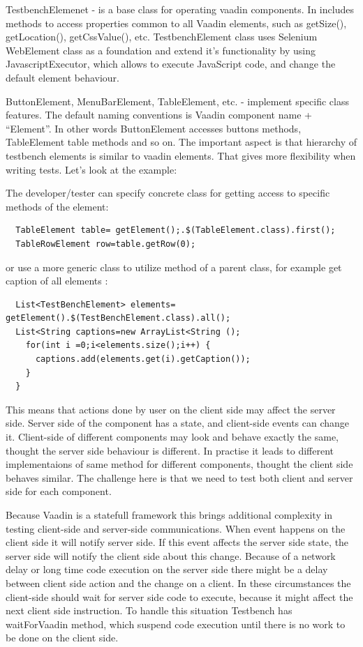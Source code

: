 \documentclass{article}
\begin{document}
TestbenchElemenet - is a base class for operating vaadin components. In includes methods to access properties common to all Vaadin elements, such as getSize(), getLocation(), getCssValue(), etc. TestbenchElement class uses Selenium WebElement class as a foundation and extend it’s functionality by using JavascriptExecutor, which allows to execute JavaScript code, and change the default element behaviour. 

ButtonElement, MenuBarElement, TableElement, etc. - implement specific class features. The default naming conventions is Vaadin component name + “Element”. In other words ButtonElement accesses buttons methods, TableElement table methods and so on. The important aspect is that hierarchy of testbench elements is similar to vaadin elements. That gives more flexibility when writing tests. Let’s look at the example:

The  developer/tester can specify concrete class for getting access to specific methods of the element:
 
 \lstset{language=Java}
  \begin{lstlisting}
  TableElement table= getElement();.$(TableElement.class).first();
  TableRowElement row=table.getRow(0);
 \end{lstlisting}
or use a more generic class to utilize method of a parent class, for example get caption of all elements :

  \lstset{language=Java}
  \begin{lstlisting}
  List<TestBenchElement> elements= getElement().$(TestBenchElement.class).all();
  List<String captions=new ArrayList<String ();
    for(int i =0;i<elements.size();i++) {
      captions.add(elements.get(i).getCaption());
    }
  }
  \end{lstlisting}

This means that actions done by user on the client side may affect the server side. Server side of the component has a state, and client-side events can change it.  Client-side of different components may look and behave exactly the same, thought
the server side behaviour is different. In practise it leads to different implementaions of same method for different components, thought the client side behaves similar. The challenge here is that we 
need to test both client and server side for each component.

Because Vaadin is a statefull framework this brings additional complexity in testing client-side and server-side communications. When event happens on the client side it will notify server side. If this event affects the server side state, the server side will notify the client side about this change. Because of a network delay or long time code execution on the server side there might be a delay between client side action and the change on a client.  In these circumstances the client-side should wait for server side code to execute, because it might affect the next client side instruction. To handle this situation Testbench has waitForVaadin method, which suspend code execution until there is no work to be done on the client side. 
      
\end{document}
